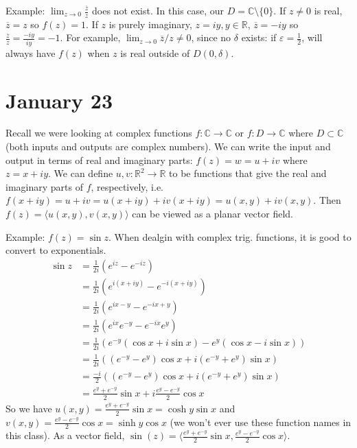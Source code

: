 \documentclass{article}
\theoremstyle{plain}
\theoremstyle{remark}
\newcommand{\R}{{\mathbb R}}
\newcommand{\C}{{\mathbb C}}
\newcommand{\ep}{{\varepsilon}}
\begin{document}
Example: $\lim_{z\to 0}\frac{\overline{z}}{z}$ does not exist.
In this case, our $D = \C \setminus \{0\}$.
If $z \neq 0$ is real, $\overline{z} = z$ so $f(z) = 1$.
If $z$ is purely imaginary, $z = iy, y\in\R$, $\overline{z} = -iy$
so $\frac{\overline{z}}{z} = \frac{-iy}{iy} = -1$.
For example, $\lim_{z\to0}\overline{z}/z \neq 0$,
since no $\delta$ exists: if $\ep = \frac12$,
will always have $f(z)$ when $z$ is real outside of $D(0,\delta)$.

\section{January 23}
Recall we were looking at complex functions $f \colon \C \to \C$
or $f \colon D \to \C$ where $D \subset \C$
(both inputs and outputs are complex numbers).
We can write the input and output in terms of real and imaginary parts:
$f(z) = w = u + iv$ where $z = x + iy$.
We can define $u,v \colon \R^2 \to \R$ to be functions
that give the real and imaginary parts of $f$, respectively,
i.e. $f(x+iy) = u + iv = u(x+iy) + iv(x+iy) = u(x,y) + iv(x,y)$.
Then $f(z) = \langle u(x,y), v(x,y) \rangle$ can be viewed as a planar vector field.

Example: $f(z) = \sin{z}$.
When dealgin with complex trig. functions, it is good to convert to exponentials.
\begin{align*}
	\sin{z} &= \frac{1}{2i}\left(e^{iz} - e^{-iz}\right)\\
			&= \frac{1}{2i} \left(e^{i(x+iy)} - e^{-i(x+iy)}\right)\\
			&= \frac{1}{2i}\left(e^{ix - y} - e^{-ix + y}\right)\\
			&= \frac{1}{2i}\left(e^{ix}e^{-y} - e^{-ix}e^y\right)\\
			&= \frac{1}{2i}\left(e^{-y}(\cos{x}+i\sin{x})
				- e^y(\cos{x} - i\sin{x})\right)\\
			&= \frac{1}{2i}\left(\left(e^{-y}-e^y\right)\cos{x}
				+ i\left(e^{-y}+e^y\right)\sin{x}\right)\\
			&= \frac{-i}{2}\left(\left(e^{-y}-e^y\right)\cos{x}
				+ i \left(e^{-y}+e^y\right)\sin{x}\right)\\
			&= \frac{e^y + e^{-y}}{2}\sin{x} + i\frac{e^y-e^{-y}}{2}\cos{x}
\end{align*}
So we have $u(x,y) = \frac{e^y + e^{-y}}{2}\sin{x} = \cosh{y}\sin{x}$
and $v(x,y) = \frac{e^y-e^{-y}}{2}\cos{x} = \sinh{y}\cos{x}$
(we won't ever use these function names in this class).
As a vector field, $\sin(z) =
\langle \frac{e^y+e^{-y}}{2}\sin{x}, \frac{e^y-e^{-y}}{2}\cos{x}\rangle$.
\end{document}
